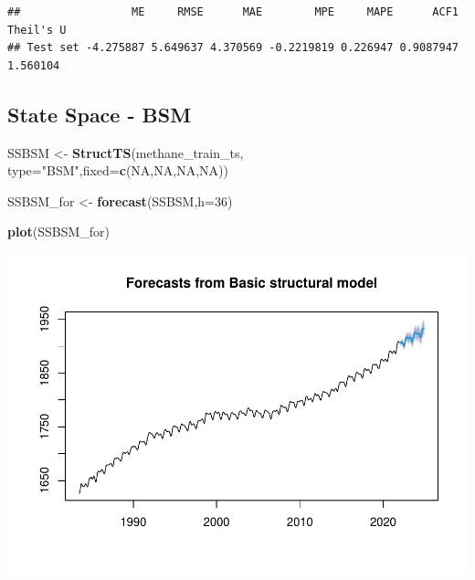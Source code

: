 \documentclass[
]{article}
\newenvironment{Shaded}{\begin{snugshade}}{\end{snugshade}}
\newcommand{\AttributeTok}[1]{\textcolor[rgb]{0.13,0.29,0.53}{#1}}
\newcommand{\ConstantTok}[1]{\textcolor[rgb]{0.56,0.35,0.01}{#1}}
\newcommand{\DecValTok}[1]{\textcolor[rgb]{0.00,0.00,0.81}{#1}}
\newcommand{\FunctionTok}[1]{\textcolor[rgb]{0.13,0.29,0.53}{\textbf{#1}}}
\newcommand{\NormalTok}[1]{#1}
\newcommand{\OtherTok}[1]{\textcolor[rgb]{0.56,0.35,0.01}{#1}}
\newcommand{\SpecialCharTok}[1]{\textcolor[rgb]{0.81,0.36,0.00}{\textbf{#1}}}
\newcommand{\StringTok}[1]{\textcolor[rgb]{0.31,0.60,0.02}{#1}}
\begin{document}
\begin{Shaded}
\end{Shaded}

\begin{verbatim}
##                 ME     RMSE      MAE        MPE     MAPE      ACF1 Theil's U
## Test set -4.275887 5.649637 4.370569 -0.2219819 0.226947 0.9087947  1.560104
\end{verbatim}

\subsection{State Space - BSM}\label{state-space---bsm}

\begin{Shaded}
\begin{Highlighting}[]
\NormalTok{SSBSM }\OtherTok{\textless{}{-}} \FunctionTok{StructTS}\NormalTok{(methane\_train\_ts,}
                    \AttributeTok{type=}\StringTok{"BSM"}\NormalTok{,}\AttributeTok{fixed=}\FunctionTok{c}\NormalTok{(}\ConstantTok{NA}\NormalTok{,}\ConstantTok{NA}\NormalTok{,}\ConstantTok{NA}\NormalTok{,}\ConstantTok{NA}\NormalTok{))}

\NormalTok{SSBSM\_for }\OtherTok{\textless{}{-}} \FunctionTok{forecast}\NormalTok{(SSBSM,}\AttributeTok{h=}\DecValTok{36}\NormalTok{)}

\FunctionTok{plot}\NormalTok{(SSBSM\_for)}
\end{Highlighting}
\end{Shaded}

\includegraphics{Methane_Forecasting_files/figure-latex/unnamed-chunk-17-1.pdf}
\end{document}
